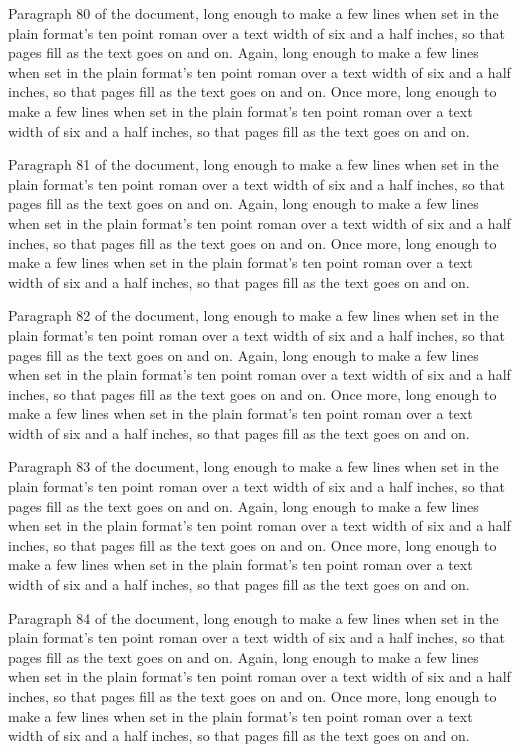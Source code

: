Paragraph 80 of the document, long enough to make a few lines when set in the plain format's ten point roman over a text width of six and a half inches, so that pages fill as the text goes on and on. Again, long enough to make a few lines when set in the plain format's ten point roman over a text width of six and a half inches, so that pages fill as the text goes on and on. Once more, long enough to make a few lines when set in the plain format's ten point roman over a text width of six and a half inches, so that pages fill as the text goes on and on.

Paragraph 81 of the document, long enough to make a few lines when set in the plain format's ten point roman over a text width of six and a half inches, so that pages fill as the text goes on and on. Again, long enough to make a few lines when set in the plain format's ten point roman over a text width of six and a half inches, so that pages fill as the text goes on and on. Once more, long enough to make a few lines when set in the plain format's ten point roman over a text width of six and a half inches, so that pages fill as the text goes on and on.

Paragraph 82 of the document, long enough to make a few lines when set in the plain format's ten point roman over a text width of six and a half inches, so that pages fill as the text goes on and on. Again, long enough to make a few lines when set in the plain format's ten point roman over a text width of six and a half inches, so that pages fill as the text goes on and on. Once more, long enough to make a few lines when set in the plain format's ten point roman over a text width of six and a half inches, so that pages fill as the text goes on and on.

Paragraph 83 of the document, long enough to make a few lines when set in the plain format's ten point roman over a text width of six and a half inches, so that pages fill as the text goes on and on. Again, long enough to make a few lines when set in the plain format's ten point roman over a text width of six and a half inches, so that pages fill as the text goes on and on. Once more, long enough to make a few lines when set in the plain format's ten point roman over a text width of six and a half inches, so that pages fill as the text goes on and on.

Paragraph 84 of the document, long enough to make a few lines when set in the plain format's ten point roman over a text width of six and a half inches, so that pages fill as the text goes on and on. Again, long enough to make a few lines when set in the plain format's ten point roman over a text width of six and a half inches, so that pages fill as the text goes on and on. Once more, long enough to make a few lines when set in the plain format's ten point roman over a text width of six and a half inches, so that pages fill as the text goes on and on.


